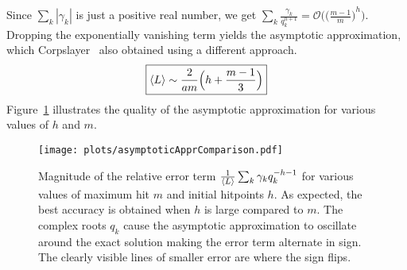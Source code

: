 Since $\sum_k|\gamma_k|$ is just a positive real number, we get $\sum_k \frac{\gamma_k}{q_k^{h+1}} = \mathcal{O}\Big({\big(\frac{m-1}{m}\big)}^h\Big)$. Dropping the exponentially vanishing term yields the asymptotic approximation, which Corpslayer~\cite{corpslayer2} also obtained using a different approach.
\begin{align}
	\boxed{\left\langle L \right\rangle
		\sim \frac{2}{am}\Big(h + \frac{m-1}{3}\Big)
	}\label{eq:asymptoticAppr}
\end{align}
Figure~\ref{fig:asymptoticApprComparison} illustrates the quality of the asymptotic approximation for various values of $h$ and $m$.
\begin{figure}[h]
    \texttt{[image: plots/asymptoticApprComparison.pdf]}
	\caption{Magnitude of the relative error term $\frac{1}{\left\langle L \right\rangle}\sum_k \gamma_k q_k^{-h-1}$ for various values of maximum hit $m$ and initial hitpoints $h$. As expected, the best accuracy is obtained when $h$ is large compared to $m$. The complex roots $q_k$ cause the asymptotic approximation to oscillate around the exact solution making the error term alternate in sign. The clearly visible lines of smaller error are where the sign flips.}\label{fig:asymptoticApprComparison}
\end{figure}
